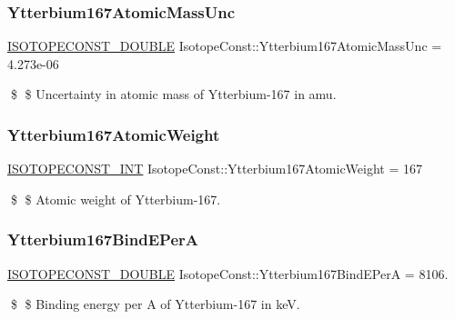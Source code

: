 \subsubsection{\texorpdfstring{Ytterbium167\+Atomic\+Mass\+Unc}{Ytterbium167AtomicMassUnc}}
{\footnotesize\ttfamily \mbox{\hyperlink{group___isotope_const-_macros_ga8f45a7272ce02c0b4c65c44636ed719a}{I\+S\+O\+T\+O\+P\+E\+C\+O\+N\+S\+T\+\_\+\+D\+O\+U\+B\+LE}} Isotope\+Const\+::\+Ytterbium167\+Atomic\+Mass\+Unc = 4.\+273e-\/06}

\$ \$ Uncertainty in atomic mass of Ytterbium-\/167 in amu. \mbox{\label{group___isotope_const-_ytterbium-_yb167_ga4095b1a674c515d4c2a08d151e315f1d}} 
\subsubsection{\texorpdfstring{Ytterbium167\+Atomic\+Weight}{Ytterbium167AtomicWeight}}
{\footnotesize\ttfamily \mbox{\hyperlink{group___isotope_const-_macros_ga5f18360b3e99483a35c32d789e62621c}{I\+S\+O\+T\+O\+P\+E\+C\+O\+N\+S\+T\+\_\+\+I\+NT}} Isotope\+Const\+::\+Ytterbium167\+Atomic\+Weight = 167}

\$ \$ Atomic weight of Ytterbium-\/167. \mbox{\label{group___isotope_const-_ytterbium-_yb167_ga17d9e1f251220f32e4850c9ed201dda5}} 
\subsubsection{\texorpdfstring{Ytterbium167\+Bind\+E\+PerA}{Ytterbium167BindEPerA}}
{\footnotesize\ttfamily \mbox{\hyperlink{group___isotope_const-_macros_ga8f45a7272ce02c0b4c65c44636ed719a}{I\+S\+O\+T\+O\+P\+E\+C\+O\+N\+S\+T\+\_\+\+D\+O\+U\+B\+LE}} Isotope\+Const\+::\+Ytterbium167\+Bind\+E\+PerA = 8106.}

\$ \$ Binding energy per A of Ytterbium-\/167 in keV. \mbox{\label{group___isotope_const-_ytterbium-_yb167_gaa7368a599ba8fb37594c6d41455b4e8b}} 
